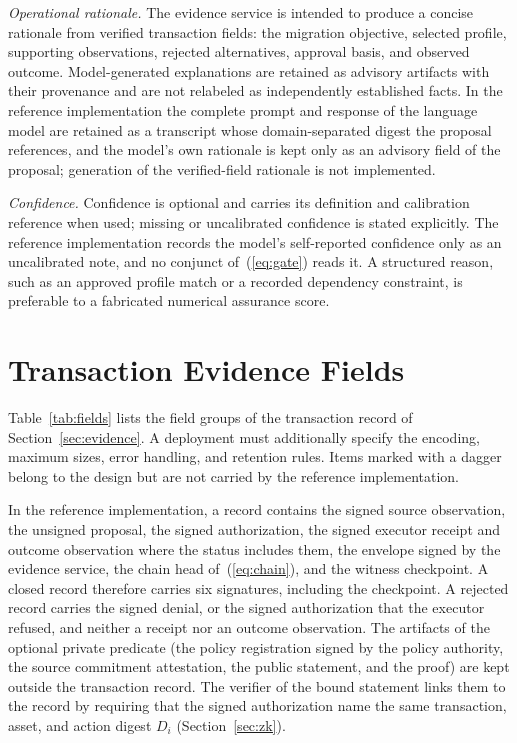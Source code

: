 \documentclass[journal]{IEEEtran}
\begin{document}
\emph{Operational rationale.} The evidence service is intended to produce a concise rationale from verified transaction fields: the migration objective, selected profile, supporting observations, rejected alternatives, approval basis, and observed outcome. Model-generated explanations are retained as advisory artifacts with their provenance and are not relabeled as independently established facts. In the reference implementation the complete prompt and response of the language model are retained as a transcript whose domain-separated digest the proposal references, and the model's own rationale is kept only as an advisory field of the proposal; generation of the verified-field rationale is not implemented.

\emph{Confidence.} Confidence is optional and carries its definition and calibration reference when used; missing or uncalibrated confidence is stated explicitly. The reference implementation records the model's self-reported confidence only as an uncalibrated note, and no conjunct of~(\ref{eq:gate}) reads it. A structured reason, such as an approved profile match or a recorded dependency constraint, is preferable to a fabricated numerical assurance score.

\section{Transaction Evidence Fields}
\label{s:fields}
Table~\ref{tab:fields} lists the field groups of the transaction record of Section~\ref{sec:evidence}. A deployment must additionally specify the encoding, maximum sizes, error handling, and retention rules. Items marked with a dagger belong to the design but are not carried by the reference implementation.

In the reference implementation, a record contains the signed source observation, the unsigned proposal, the signed authorization, the signed executor receipt and outcome observation where the status includes them, the envelope signed by the evidence service, the chain head of~(\ref{eq:chain}), and the witness checkpoint. A closed record therefore carries six signatures, including the checkpoint. A rejected record carries the signed denial, or the signed authorization that the executor refused, and neither a receipt nor an outcome observation. The artifacts of the optional private predicate (the policy registration signed by the policy authority, the source commitment attestation, the public statement, and the proof) are kept outside the transaction record. The verifier of the bound statement links them to the record by requiring that the signed authorization name the same transaction, asset, and action digest $D_i$ (Section~\ref{sec:zk}).
\end{document}
